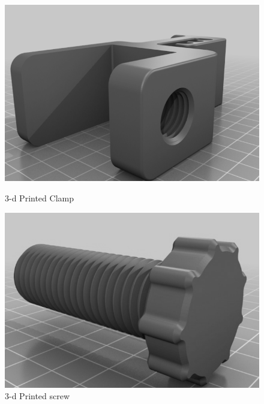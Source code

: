\documentclass[11pt, a4paper, openany]{book}
\begin{document}
\begin{figure}[H]
  \centering
  \begin{minipage}[b]{0.4\textwidth}
  \begin{center}
    \includegraphics[scale=0.32]{Labbot&ele/3-d1.png}
    \caption{3-d Printed Clamp\cite{Github}}
    \label{fig:3d} 
      \end{center}
  \end{minipage}
  \hfill
  \begin{minipage}[b]{0.4\textwidth}
  \includegraphics[scale=0.35]{Labbot&ele/3-d2.png}
    \caption{3-d Printed screw \cite{Github}}
    \label{fig:OSinter} 
  \end{minipage}
\end{figure}
\end{document}
